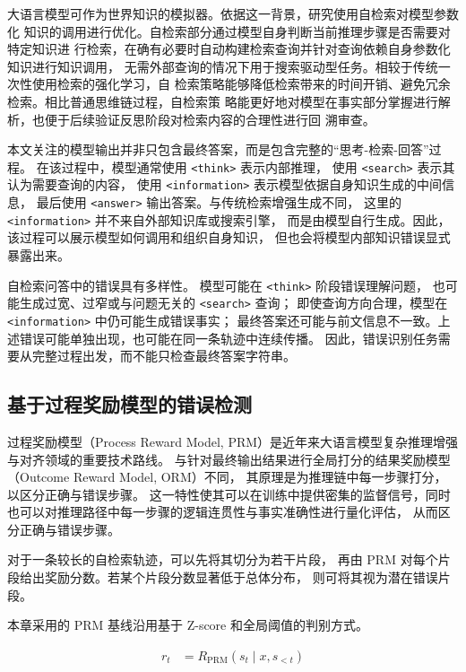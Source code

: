 大语言模型可作为世界知识的模拟器。依据这一背景，研究使用自检索\cite{fan2025ssrlselfsearchreinforcementlearning}对模型参数化
知识的调用进行优化。自检索部分通过模型自身判断当前推理步骤是否需要对特定知识进
行检索，在确有必要时自动构建检索查询并针对查询依赖自身参数化知识进行知识调用，
无需外部查询的情况下用于搜索驱动型任务。相较于传统一次性使用检索的强化学习，自
检索策略能够降低检索带来的时间开销、避免冗余检索。相比普通思维链过程，自检索策
略能更好地对模型在事实部分掌握进行解析，也便于后续验证反思阶段对检索内容的合理性进行回
溯审查。

本文关注的模型输出并非只包含最终答案，而是包含完整的“思考-检索-回答”过程。
在该过程中，模型通常使用 \verb|<think>| 表示内部推理，
使用 \verb|<search>| 表示其认为需要查询的内容，
使用 \verb|<information>| 表示模型依据自身知识生成的中间信息，
最后使用 \verb|<answer>| 输出答案。与传统检索增强生成不同，
这里的 \verb|<information>| 并不来自外部知识库或搜索引擎，
而是由模型自行生成。因此，该过程可以展示模型如何调用和组织自身知识，
但也会将模型内部知识错误显式暴露出来。

自检索问答中的错误具有多样性。
模型可能在 \verb|<think>| 阶段错误理解问题，
也可能生成过宽、过窄或与问题无关的 \verb|<search>| 查询；
即使查询方向合理，模型在 \verb|<information>| 中仍可能生成错误事实；
最终答案还可能与前文信息不一致。上述错误可能单独出现，也可能在同一条轨迹中连续传播。
因此，错误识别任务需要从完整过程出发，而不能只检查最终答案字符串\cite{ref15_he2025large,ref16_you2025probabilistic}。

\subsection{基于过程奖励模型的错误检测}

过程奖励模型（Process Reward Model, PRM）是近年来大语言模型复杂推理增强与对齐领域的重要技术路线。
与针对最终输出结果进行全局打分的结果奖励模型（Outcome Reward Model, ORM）不同，
其原理是为推理链中每一步骤打分，以区分正确与错误步骤。
这一特性使其可以在训练中提供密集的监督信号，同时也可以对推理路径中每一步骤的逻辑连贯性与事实准确性进行量化评估，
从而区分正确与错误步骤。



对于一条较长的自检索轨迹，可以先将其切分为若干片段，
再由 PRM 对每个片段给出奖励分数\cite{ref15_he2025large}。若某个片段分数显著低于总体分布，
则可将其视为潜在错误片段。

本章采用的 PRM 基线沿用基于 Z-score 和全局阈值的判别方式。

\begin{align}
r_t &= R_{\mathrm{PRM}}(s_t \mid x, s_{<t}) 
\end{align}

